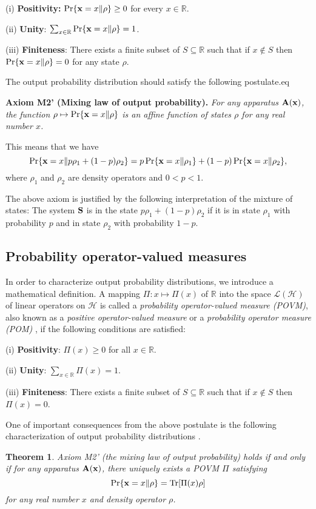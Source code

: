 \documentclass[12pt]{article}
\newcommand{\eeq}{\end{equation}}
\newcommand{\beql}[1]{\begin{equation}\label{eq:#1}}
\newcommand{\bA}{{\bf A}}
\newcommand{\bS}{{\bf S}}
\newcommand{\cH}{{\mathcal H}}
\newcommand{\cL}{{\mathcal L}}
\newcommand{\rh}{\rho}
\newcommand{\Tr}{\mbox{\rm Tr}}
\newcommand{\bx}{{\bf x}}
\newtheorem{Theorem}{Theorem}
\newcommand{\R}{\mathbb{R}}
\begin{document}
(i) {\bf Positivity:} $\Pr\{\bx=x\|\rh\}\ge0$ for every $x\in\R$.

(ii) {\bf Unity}: $\sum_{x\in\R}\Pr\{\bx=x\|\rh\}=1$.

(iii) {\bf Finiteness}: There exists a finite subset of $S\subseteq\R$
such that if $x\not\in S$ then $\Pr\{\bx=x\|\rh\}=0$
for any state $\rh$.

The output probability distribution should satisfy the following
postulate.eq
\bigskip

{\bf Axiom M2' (Mixing law of output probability).}
{\em For any apparatus $\bA(\bx)$, the
function $\rh\mapsto\Pr\{\bx=x\|\rh\}$ is
an affine function of states $\rh$ for any real number $x$.}
\bigskip

This means that we have 
$$
\Pr\{\bx=x\|p\rh_{1}+(1-p)\rh_{2}\}
=p\Pr\{\bx=x\|\rh_{1}\}+(1-p)\Pr\{\bx=x\|\rh_{2}\},
$$
where $\rh_{1}$ and $\rh_{2}$ are density operators and $0<p<1$. 

The above axiom is justified by the following interpretation of
the mixture of states:  The system $\bS$ is in the state
$p\rh_{1}+(1-p)\rh_{2}$ if  it is in state $\rh_{1}$ with
probability $p$ and in state $\rh_{2}$ with probability $1-p$.

\subsection{Probability operator-valued measures}

In order to characterize output probability distributions, we introduce a mathematical
definition.  A mapping $\Pi:x \mapsto \Pi(x)$ 
of $\R$ into the space  $\cL(\cH)$ of linear operators on 
$\cH$ is called a
{\em probability operator-valued measure (POVM)}, also known as a {\em
positive operator-valued measure} or a {\em probability operator measure (POM)}
\cite{Hel76}, if the following conditions are satisfied: 

(i) {\bf Positivity}: $\Pi(x)\ge 0$ for all
$x\in\R$. 

(ii) {\bf Unity}: $\sum_{x\in\R}\Pi(x)=1$. 

(iii) {\bf Finiteness}: There exists a finite subset of $S\subseteq\R$
such that if $x\not\in S$ then $\Pi(x)=0$.

One of important consequences from the above postulate is
the following characterization of output probability 
distributions \cite{80OG}.

\begin{Theorem}\label{th:POVM}
Axiom M2' (the mixing law of output probability) holds if and only if
for any apparatus $\bA(\bx)$, there  uniquely exists  a 
POVM $\Pi$ satisfying
\beql{Born-POVM}
\Pr\{\bx=x\|\rh\}
=
\Tr[\Pi(x)\rh]
\eeq
for any real number $x$ and  density operator $\rh$.
\end{Theorem}
\end{document}
